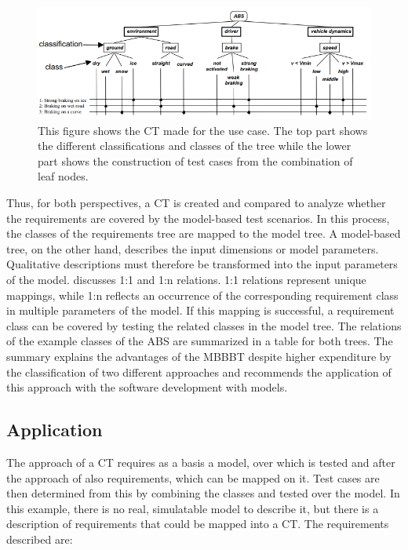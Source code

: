 \begin{figure}[H]
\centering
\includegraphics[scale=0.75]{../../individual/groeger/images/ClassificationTreeExample.png} 
\caption{This figure shows the CT made for the use case. The top part shows the different classifications and classes of the tree while the lower part shows the construction of test cases from the combination of leaf nodes.}
\label{fig:ABS_CT}
\end{figure}

Thus, for both perspectives, a CT is created and compared to analyze whether the requirements are covered by the model-based test scenarios. In this process, the classes of the requirements tree are mapped to the model tree. A model-based tree, on the other hand, describes the input dimensions or model parameters. Qualitative descriptions must therefore be transformed into the input parameters of the model. \cite{Conrad} discusses 1:1 and 1:n relations. 1:1 relations represent unique mappings, while 1:n reflects an occurrence of the corresponding requirement class in multiple parameters of the model. If this mapping is successful, a requirement class can be covered by testing the related classes in the model tree. The relations of the example classes of the ABS are summarized in a table for both trees. The summary explains the advantages of the MBBBT despite higher expenditure by the classification of two different approaches and recommends the application of this approach with the software development with models.

\subsection{Application}

The approach of a CT requires as a basis a model, over which is tested and after the approach of \cite{Conrad} also requirements, which can be mapped on it. Test cases are then determined from this by combining the classes and tested over the model. In this example, there is no real, simulatable model to describe it, but there is a description of requirements that could be mapped into a CT. The requirements described are:

